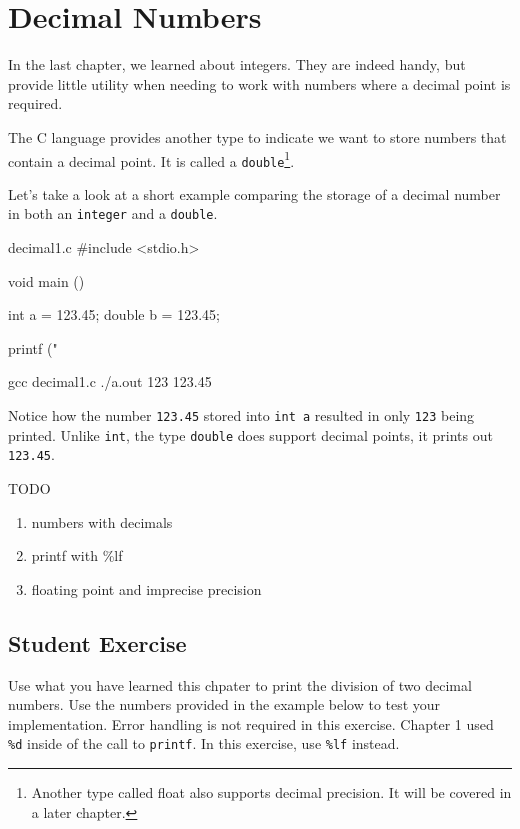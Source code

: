 \chapter{Decimal Numbers}

In the last chapter, we learned about integers. They are indeed handy, but
provide little utility when needing to work with numbers where a decimal point
is required.

The C language provides another type to indicate we want to store numbers that
contain a decimal point. It is called a \verb|double|\footnote{Another type
called float also supports decimal precision. It will be covered in a later
chapter.}.

Let's take a look at a short example comparing the storage of a decimal number
in both an \verb|integer| and a \verb|double|.

\begin{code}{decimal1.c}
#include <stdio.h>

void main ()
{
    int a = 123.45;
    double b = 123.45;

    printf ("%
}
\end{code}

\begin{Terminal}
gcc decimal1.c
./a.out
123 123.45
\end{Terminal}

Notice how the number \verb|123.45| stored into \verb|int a| resulted in only
\verb|123| being printed. Unlike \verb|int|, the type \verb|double| does
support decimal points, it prints out \verb|123.45|.


TODO
\begin{enumerate}
\item numbers with decimals
\item printf with \%lf
\item floating point and imprecise precision
\end{enumerate}


\section{Student Exercise}

Use what you have learned this chpater to print the division of two decimal
numbers. Use the numbers provided in the example below to test your
implementation. Error handling is not required in this exercise. Chapter 1 used
\verb|%d| inside of the call to \verb|printf|. In this exercise, use \verb|%lf|
instead.

